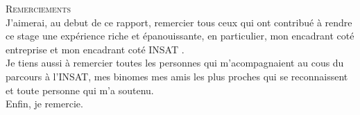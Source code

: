 
\thispagestyle{plain}

\begin{center}
    \huge \textsc{Remerciements}\\[2cm]
    \large
        J'aimerai, au debut de ce rapport, remercier tous ceux qui ont contribué
        à rendre ce stage une expérience riche et épanouissante, en particulier,
        mon encadrant coté entreprise \mentor{} et mon encadrant coté INSAT \correspondent.\\[1cm]


        Je tiens aussi à remercier toutes les personnes qui m'acompagnaient au cous du parcours à l'INSAT, mes binomes
        mes amis les plus proches qui se reconnaissent et toute personne qui m'a soutenu.\\[1cm]


        Enfin, je remercie.\\[1cm]
\end{center}
